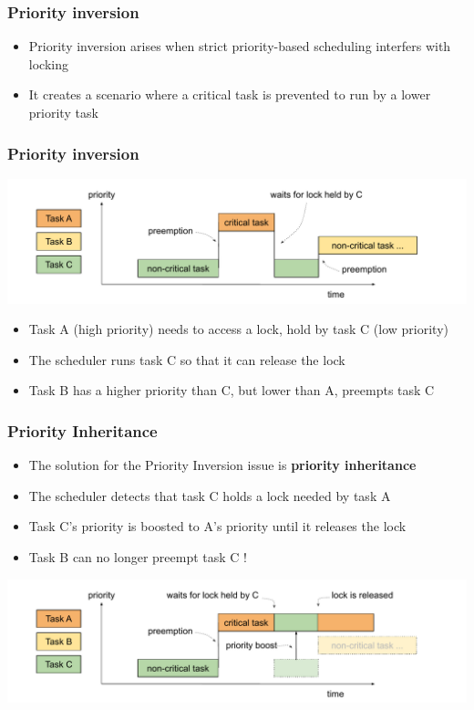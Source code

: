 \begin{frame}
  \frametitle{Priority inversion}
	\begin{itemize}
		\item Priority inversion arises when strict priority-based scheduling interfers with locking
		\item It creates a scenario where a critical task is prevented to run by a lower priority task
	\end{itemize}
\end{frame}

\begin{frame}
  \frametitle{Priority inversion}
	\includegraphics[height=0.5\textheight]{slides/realtime-linux-realtime-systems/priority_inversion.pdf}
	\begin{itemize}
		\item Task A (high priority) needs to access a lock, hold by task C (low priority)
		\item The scheduler runs task C so that it can release the lock
		\item Task B has a higher priority than C, but lower than A, preempts task C
	\end{itemize}
\end{frame}

\begin{frame}
  \frametitle{Priority Inheritance}
	\begin{itemize}
		\item The solution for the Priority Inversion issue is \textbf{priority inheritance}
		\item The scheduler detects that task C holds a lock needed by task A
		\item Task C's priority is boosted to A's priority until it releases the lock
		\item Task B can no longer preempt task C !
	\end{itemize}
	\includegraphics[height=0.5\textheight]{slides/realtime-linux-realtime-systems/priority_inheritance.pdf}
\end{frame}

